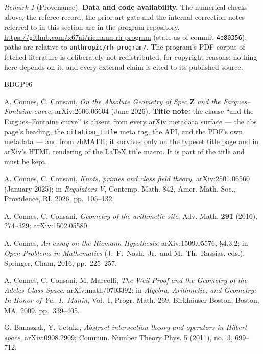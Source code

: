 \documentclass[11pt]{article}
\theoremstyle{definition}
\theoremstyle{remark}
\newtheorem*{remarkunnum}{Remark}
\newcommand{\Z}{\mathbf{Z}}
\begin{document}
\begin{remarkunnum}[Provenance]
\medskip

\noindent\textbf{Data and code availability.} The numerical checks above, the
referee record, the prior-art gate and the internal correction notes referred to
in this section are in the program repository,
\url{https://github.com/x67ai/riemann-rh-program} (state as of commit
\texttt{4e80356}); paths are relative to \texttt{anthropic/rh-program/}. The
program's PDF corpus of fetched literature is deliberately not redistributed, for
copyright reasons; nothing here depends on it, and every external claim is cited
to its published source.
\end{remarkunnum}

\begin{thebibliography}{BDGP96}

 A. Connes, C. Consani, \emph{On the Absolute Geometry
of Spec $\Z$ and the Fargues--Fontaine curve}, arXiv:2606.06604 (June
2026). \textbf{Title note:} the clause ``and the Fargues--Fontaine curve'' is
absent from every arXiv metadata surface --- the abs page's heading, the
\texttt{citation\_title} meta tag, the API, and the PDF's own metadata --- and
from zbMATH; it survives only on the typeset title page and in arXiv's HTML
rendering of the \LaTeX{} title macro. It is part of the title and must be kept.

 A. Connes, C. Consani, \emph{Knots, primes and class
field theory}, arXiv:2501.06560 (January 2025); in \emph{Regulators V},
Contemp. Math. 842, Amer. Math. Soc., Providence, RI, 2026, pp.~105--132.

 A. Connes, C. Consani, \emph{Geometry of the
arithmetic site}, Adv. Math. \textbf{291} (2016), 274--329;
arXiv:1502.05580.

 A. Connes, \emph{An essay on the Riemann Hypothesis},
arXiv:1509.05576, \S4.3.2; in \emph{Open Problems in Mathematics}
(J.~F.~Nash,~Jr.\ and M.~Th.~Rassias, eds.), Springer, Cham, 2016,
pp.~225--257.

 A. Connes, C. Consani, M. Marcolli, \emph{The Weil
Proof and the Geometry of the Adeles Class Space}, arXiv:math/0703392;
in \emph{Algebra, Arithmetic, and Geometry: In Honor of Yu.~I.~Manin},
Vol.~I, Progr. Math. 269, Birkh\"auser Boston, Boston, MA, 2009,
pp.~339--405.

 G. Banaszak, Y. Uetake, \emph{Abstract intersection
theory and operators in Hilbert space}, arXiv:0908.2909; Commun. Number
Theory Phys. 5 (2011), no.~3, 699--712.


\end{thebibliography}
\end{document}
